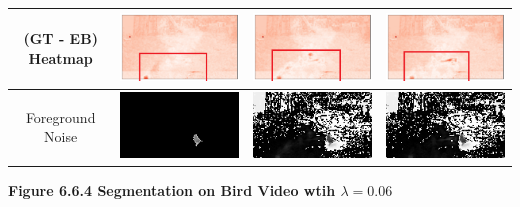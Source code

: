 \documentclass[11pt]{scrartcl} %
\theoremstyle{plain}
\begin{document}
\begin{minipage}{\linewidth}
\begin{tabular}{ | c | m{2.8cm} | m{2.8cm} | m{2.8cm} | }
	(GT - EB) Heatmap
	&
    \begin{minipage}{.3\textwidth}
      \includegraphics[width=\linewidth, width=25mm]{figures_video/crow/rpca/hm_0_06.png}
    \end{minipage}	
	&
    \begin{minipage}{.3\textwidth}
      \includegraphics[width=\linewidth, width=25mm]{figures_video/crow/pca/hm_0.png}
    \end{minipage}		
	&
    \begin{minipage}{.3\textwidth}
      \includegraphics[width=\linewidth, width=25mm]{figures_video/crow/pca2/hm_0.png}
    \end{minipage}		
	\\ \hline	
	
	Foreground Noise
	&
    \begin{minipage}{.3\textwidth}
      \includegraphics[width=\linewidth, width=25mm]{figures_video/crow/rpca/noise_0_06.png}
    \end{minipage}
	&
    \begin{minipage}{.3\textwidth}
      \includegraphics[width=\linewidth, width=25mm]{figures_video/crow/pca/noise_0.png}
    \end{minipage}
	&
    \begin{minipage}{.3\textwidth}
      \includegraphics[width=\linewidth, width=25mm]{figures_video/crow/pca2/noise_0.png}
    \end{minipage}
	\\ \hline	
	
  \end{tabular}

\bigskip
\centerline{\textbf{Figure 6.6.4 Segmentation on Bird Video wtih $\lambda = 0.06$ }}
\egroup
\end{minipage}
\end{document}
